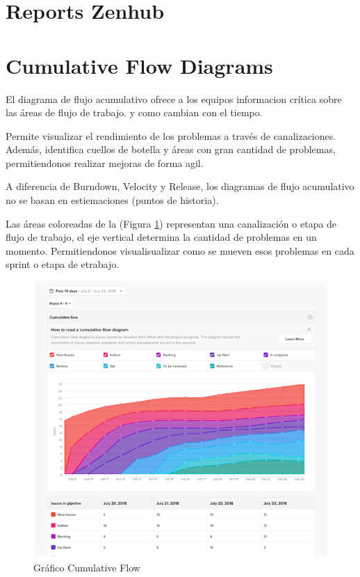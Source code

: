 \documentclass[11pt]{article}
\begin{document}
\section*{\textbf{Reports Zenhub}} 

\section*{Cumulative Flow Diagrams } 

El diagrama de flujo acumulativo ofrece a los equipos informacion crítica sobre las áreas de flujo de trabajo. y como cambian con el tiempo. 

Permite visualizar el rendimiento de los problemas a través de canalizaciones. Además, identifica cuellos de botella y áreas con gran cantidad de problemas, permitiendonos realizar mejoras de forma agil.

A diferencia de Burndown, Velocity y Release, los diagramas de flujo acumulativo no se basan en estiemaciones (puntos de historia).

Las áreas coloreadas de la (Figura \ref{fig:cumulative}) representan una canalización o etapa de flujo de trabajo, el eje vertical determina la cantidad de problemas en un momento. Permitiendonos visualisualizar como se mueven esos problemas en cada sprint o etapa de etrabajo.


\begin{figure}[h!] 
\centering
    \includegraphics[width=1\textwidth]{cumulative_flow.PNG}
\caption{Gráfico Cumulative Flow}
\label{fig:cumulative}
\end{figure}
\end{document}
